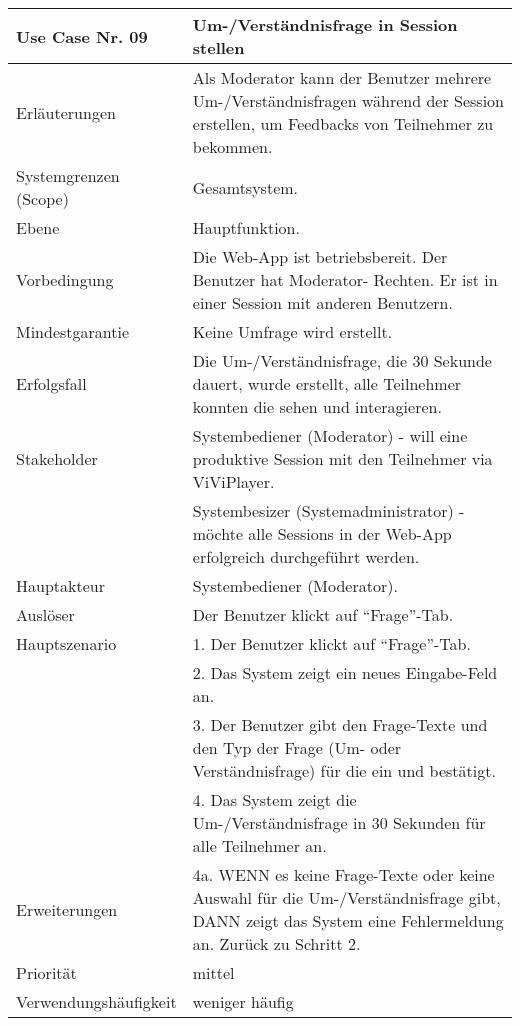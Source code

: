 \begin{tabularx}{\linewidth}{|l|X|}
	\hline
	Use Case Nr. 09			& \textbf{Um-/Verständnisfrage in Session stellen} \\ \hline
	Erläuterungen			& Als Moderator kann der Benutzer mehrere Um-/Verständnisfragen 
							  während der Session erstellen, um Feedbacks von Teilnehmer zu bekommen. \\ \hline
	Systemgrenzen (Scope)	& Gesamtsystem. \\ \hline
	Ebene					& Hauptfunktion. \\ \hline
	Vorbedingung			& Die Web-App ist betriebsbereit. Der Benutzer hat Moderator-
							  Rechten. Er ist in einer Session mit anderen Benutzern. \\ \hline
	Mindestgarantie			& Keine Umfrage wird erstellt. \\ \hline
	Erfolgsfall 			& Die Um-/Verständnisfrage, die 30 Sekunde dauert, wurde erstellt, 
							  alle Teilnehmer konnten die sehen und interagieren. \\ \hline
	Stakeholder				& Systembediener (Moderator) - will eine produktive Session mit den 
							  Teilnehmer via ViViPlayer. \\
							& Systembesizer (Systemadministrator) - möchte alle Sessions in der 
							  Web-App erfolgreich durchgeführt werden. \\ \hline
	Hauptakteur				& Systembediener (Moderator). \\ \hline
	Auslöser				& Der Benutzer klickt auf ``Frage''-Tab. \\ \hline	
	Hauptszenario			& 1. Der Benutzer klickt auf ``Frage''-Tab. \\
							& 2. Das System zeigt ein neues Eingabe-Feld an. \\ 
							& 3. Der Benutzer gibt den Frage-Texte und den Typ der Frage (Um- 
							  oder Verständnisfrage) für die ein und bestätigt. \\
							& 4. Das System zeigt die Um-/Verständnisfrage in 30 Sekunden für 
							  alle Teilnehmer an. \\ \hline
	Erweiterungen			& 4a. WENN es keine Frage-Texte oder keine Auswahl für die 
							  Um-/Verständnisfrage gibt, DANN zeigt das System eine Fehlermeldung an. Zurück zu Schritt 2. \\ \hline
	Priorität				& mittel \\ \hline
	Verwendungshäufigkeit	& weniger häufig \\ \hline
\end{tabularx}